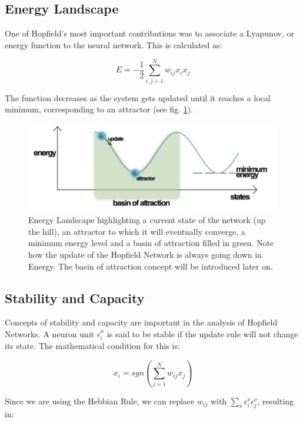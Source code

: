 \subsection{Energy Landscape}

One of Hopfield's most important contributions was to associate a Lyapunov, or energy function to the neural network. This is calculated as:

\[ E = -\frac{1}{2} \sum_{i,j=1}^{N}w_{ij}x_{i}x_{j} \]

The function decreases as the system gets updated until it reaches a local minimum, corresponding to an attractor (see fig. \ref{fig:energy_landscape}).


\begin{figure}[h]
  \centering
\includegraphics[scale=0.25]{energy_landscape.png}
\caption{Energy Landscape highlighting a current state of the network (up the hill), an attractor to which it will eventually converge, a minimum energy level and a basin of attraction filled in green. Note how the update of the Hopfield Network is always going down in Energy. The basin of attraction concept will be introduced later on.}
\label{fig:energy_landscape}
\end{figure}

\subsection{Stability and Capacity}

Concepts of stability and capacity are important in the analysis of Hopfield Networks. A neuron unit \( \epsilon_{i}^{\mu}\) is said to be stable if the update rule will not change its state. The mathematical condition for this is:

 \[x_{i} = sgn(\sum_{j=1}^{N}w_{ij}x_{j}) \]

Since we are using the Hebbian Rule, we can replace \(w_{ij}\) with
\(\sum_{\nu}\epsilon_{i}^{\nu}\epsilon_{j}^{\nu}\), resulting in:

